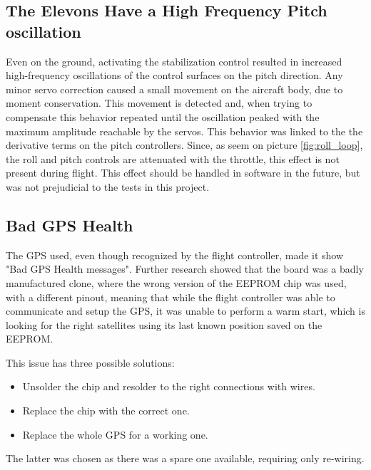 \subsection{The Elevons Have a High Frequency Pitch oscillation}
Even on the ground, activating the stabilization control resulted in increased high-frequency oscillations of the control surfaces on the pitch direction.
%
Any minor servo correction caused a small movement on the aircraft body, due to moment conservation. This movement is detected and, when trying to compensate this behavior repeated until the oscillation peaked with the maximum amplitude reachable by the servos.
%
This behavior was linked to the the derivative terms on the pitch controllers.
%
Since, as seem on picture \ref{fig:roll_loop}, the roll and pitch controls are attenuated with the throttle, this effect is not present during flight. This effect should be handled in software in the future, but was not prejudicial to the tests in this project.

\subsection{Bad GPS Health}
\label{badgps}
The GPS used, even though recognized by the flight controller, made it show "Bad GPS Health messages". Further research showed that the board was a badly manufactured clone\cite{badgps}, where the wrong version of the EEPROM chip was used, with a different pinout, meaning that while the flight controller was able to communicate and setup the GPS, it was unable to perform a warm start, which is looking for the right satellites using its last known position saved on the EEPROM.

This issue has three possible solutions:
\begin{itemize}
\item Unsolder the chip and resolder to the right connections with wires.
\item Replace the chip with the correct one.
\item Replace the whole GPS for a working one.
\end{itemize}

The latter was chosen as there was a spare one available, requiring only re-wiring.